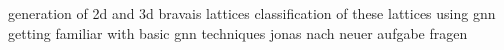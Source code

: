 generation of 2d and 3d bravais lattices
classification of these lattices using gnn
getting familiar with basic gnn techniques
jonas nach neuer aufgabe fragen